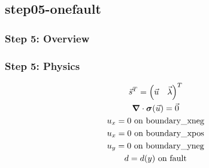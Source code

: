 \documentclass[aspectratio=169]{beamer}
\begin{document}
\subsection{step05-onefault}

\begin{frame}
  \frametitle{Step 5: Overview}

      
\end{frame}


\begin{frame}
  \frametitle{Step 5: Physics}
  \summary{}

  \begin{minipage}{0.3\textwidth}
    {\scriptsize
    \begin{gather*}
    \vec{s}^T = \left( \vec{u} \quad \vec{\lambda} \right)^T \\
    \bm{\nabla} \cdot \bm{\sigma}(\vec{u}) = \vec{0} \\
    u_x = 0 \text{ on boundary\_xneg} \\
    u_x = 0 \text{ on boundary\_xpos} \\
    u_y = 0 \text{ on boundary\_yneg} \\
    d = d(y) \text{ on fault}
    \end{gather*}}
  \end{minipage}
  \hfill
  \begin{minipage}{0.67\textwidth}
  \end{minipage}
      
\end{frame}
\end{document}
